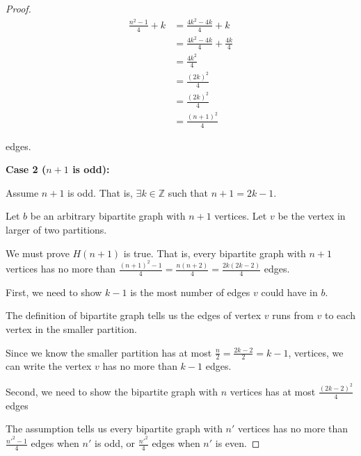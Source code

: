 \documentclass[12pt]{article}
\begin{document}
\begin{enumerate}[a.]
\begin{proof}
        \begin{align}
            \frac{n^2-1}{4} + k &=\frac{4k^2-4k}{4} + k\\
            &= \frac{4k^2-4k}{4} + \frac{4k}{4}\\
            &= \frac{4k^2}{4}\\
            &= \frac{(2k)^2}{4}\\
            &= \frac{(2k)^2}{4}\\
            &= \frac{(n+1)^2}{4}
        \end{align}

        edges.

        \bigskip

        \textbf{Case 2 ($n+1$ is odd):}

        \bigskip

        Assume $n+1$ is odd. That is, $\exists k \in \mathbb{Z}$ such that
        $n+1 = 2k-1$.

        \bigskip

        Let $b$ be an arbitrary bipartite graph with $n+1$ vertices. Let
        $v$ be the vertex in larger of two partitions.

        \bigskip

        We must prove $H(n+1)$ is true. That is, every bipartite graph
        with $n+1$ vertices has no more than $\frac{(n+1)^2-1}{4} = \frac{n(n+2)}{4} = \frac{2k(2k-2)}{4}$
        edges.

        \bigskip

        First, we need to show $k-1$ is the most number of edges $v$
        could have in $b$.

        \bigskip

        The definition of bipartite graph tells us the edges of vertex
        $v$ runs from $v$ to each vertex in the smaller partition.

        \bigskip

        Since we know the smaller partition has at most $\frac{n}{2} = \frac{2k-2}{2} = k - 1$,
        vertices, we can write the vertex $v$ has no more than $k-1$ edges.

        \bigskip

        Second, we need to show the bipartite graph with $n$ vertices has
        at most $\frac{(2k-2)^2}{4}$ edges

        \bigskip

        The assumption tells us every bipartite graph with $n'$ vertices
        has no more than $\frac{n'^2-1}{4}$ edges when $n'$ is odd, or
        $\frac{n'^2}{4}$ edges when $n'$ is even.


\end{proof}
\end{enumerate}
\end{document}
